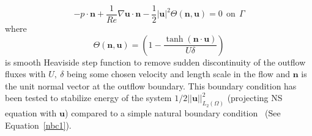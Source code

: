\begin{equation}
\boxed{-p\cdot \mathbf{n} + \frac{1}{Re}\nabla  \mathbf{u} \cdot \mathbf{n} - \frac{1}{2}\vert \mathbf{u} \vert ^{2}\Theta (\mathbf{n},\mathbf{u}) = 0 \ \ \mbox{on} \ \ \Gamma} \label{nbc2}
\end{equation}
where
$$ \Theta (\mathbf{n},\mathbf{u}) = \left(1 - \frac{\tanh(\mathbf{n} \cdot \mathbf{u})}{U\delta}\right)$$ is smooth Heaviside step function to remove sudden discontinuity of the outflow fluxes with $U, \ \delta$ being some chosen velocity and length scale in the flow and $\mathbf{n}$ is the unit normal vector at the outflow boundary. This boundary condition has been tested to stabilize energy of the system $1/2 \vert\vert \mathbf{u}\vert \vert^{2}_{L_2({\Omega})}$ (projecting NS equation with $\mathbf{u}$) compared to a simple natural boundary condition~\cite{erik} (See Equation~\ref{nbc1}).
